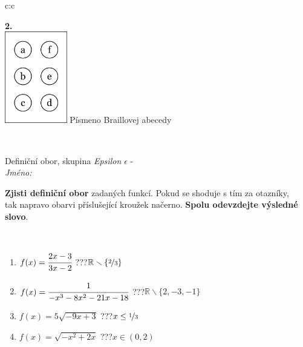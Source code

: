 \documentclass[10pt]{report}
\begin{document}
\begin{tabular}{c:c}
\begin{minipage}[c][104.5mm][t]{0.5\linewidth}
\begin{center}
\begin{minipage}{0.20\linewidth}
\begin{center}
{\Huge\bfseries 2.} \\[2mm]
\includegraphics[height=40mm]{../images/braille.png}
{\small Písmeno Braillovej abecedy}
\end{center}
\end{minipage}
\end{center}
\end{minipage}
\\ \hdashline
\begin{minipage}[c][104.5mm][t]{0.5\linewidth}
\begin{center}
\vspace{7mm}
{\huge Definiční obor, skupina \textit{Epsilon $\epsilon$} -}\\[5mm]
\textit{Jméno:}\phantom{xxxxxxxxxxxxxxxxxxxxxxxxxxxxxxxxxxxxxxxxxxxxxxxxxxxxxxxxxxxxxxxxx}\\[5mm]
\begin{minipage}{0.95\linewidth}
\begin{center}
\textbf{Zjisti definiční obor} zadaných funkcí. Pokud se shoduje s tím za otazníky,\\tak napravo obarvi příslušející kroužek načerno. \textbf{Spolu odevzdejte výsledné slovo}.
\end{center}
\end{minipage}
\\[1mm]
\begin{minipage}{0.79\linewidth}
\begin{center}
\begin{varwidth}{\linewidth}
\begin{enumerate}
\normalsizerrr
\item $f(x)=\cfrac{2x-3}{3x-2}$\quad \dotfill\; ???\;\dotfill \quad $\mathbb{R}\smallsetminus\{\nicefrac{2}{3}\}$
\item $f(x)=\cfrac{1}{-x^3-8x^2-21x-18}$\quad \dotfill\; ???\;\dotfill \quad $\mathbb{R}\smallsetminus\{2,-3,-1\}$
\item $f(x)=5\sqrt{-9x+3}$\quad \dotfill\; ???\;\dotfill \quad $x\leq\nicefrac{1}{3}$
\item $f(x)=\sqrt{-x^2+2x}$\quad \dotfill\; ???\;\dotfill \quad $x\in(0 , 2)$

\end{enumerate}
\end{varwidth}
\end{center}
\end{minipage}
\end{center}
\end{minipage}
\end{tabular}
\end{document}
